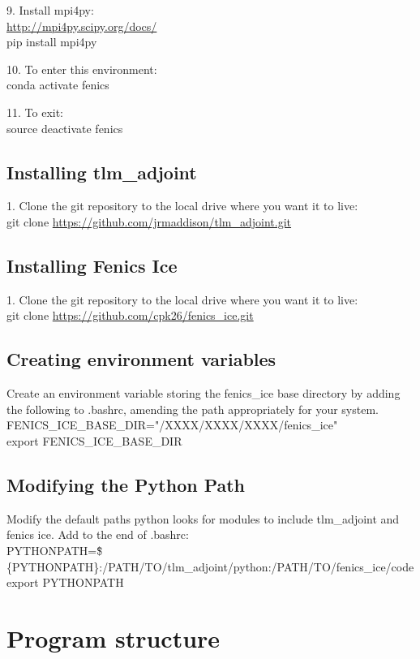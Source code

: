 \documentclass[11pt, reqno, nocenter]{article}
\begin{document}
9. Install mpi4py: \\
\url{http://mpi4py.scipy.org/docs/} \\
pip install mpi4py

10. To enter this environment: \\
conda activate fenics

11. To exit: \\
source deactivate fenics

\subsection{Installing tlm\_adjoint}

1. Clone the git repository to the local drive where you want it to live:\\
git clone \url{https://github.com/jrmaddison/tlm_adjoint.git}

\subsection{Installing Fenics Ice}

1. Clone the git repository to the local drive where you want it to live: \\
git clone \url{https://github.com/cpk26/fenics_ice.git}


\subsection{Creating environment variables}
Create an environment variable storing the fenics\_ice base directory by adding the following to .bashrc, amending the path appropriately for your system. \\
FENICS\_ICE\_BASE\_DIR="/XXXX/XXXX/XXXX/fenics\_ice" \\                                            
export FENICS\_ICE\_BASE\_DIR   


\subsection{Modifying the Python Path}

Modify the default paths python looks for modules to include tlm\_adjoint and fenics ice. Add to the end of .bashrc: \\
PYTHONPATH=\"\$\{PYTHONPATH\}:/PATH/TO/tlm\_adjoint/python:/PATH/TO/fenics\_ice/code\" \\
export PYTHONPATH

\section{Program structure}
\end{document}
